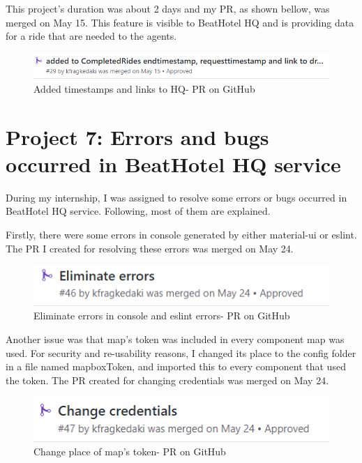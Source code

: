This project's duration was about 2 days and my PR, as shown bellow, was merged on May 15. This feature is visible to BeatHotel HQ and is providing data for a ride that are needed to the agents. \par

\begin{figure}[H]
	\begin{center}
		\includegraphics[scale=0.85]{images/my_projects/feature-add-timestamp-linkToHQ-PR.png}
	\end{center}
	\caption{Added timestamps and links to HQ- PR on GitHub}
\end{figure}


\section{Project 7: Errors and bugs occurred in BeatHotel HQ service}

During my internship, I was assigned to resolve some errors or bugs occurred in BeatHotel HQ service. Following, most of them are explained. \par

Firstly, there were some errors in console generated by either material-ui or eslint. The PR I created for resolving these errors was merged on May 24.

\begin{figure}[H]
	\begin{center}
		\includegraphics[scale=0.85]{images/my_projects/fix-eliminate-errors-PR.png}
	\end{center}
	\caption{Eliminate errors in console and eslint errors- PR on GitHub}
\end{figure}

Another issue was that map's token was included in every component map was used. For security and re-usability reasons, I changed its place to the config folder in a file named mapboxToken, and imported this to every component that used the token. The PR created for changing credentials was merged on May 24.

\begin{figure}[H]
	\begin{center}
		\includegraphics[scale=0.85]{images/my_projects/fix-change-credentials-PR.png}
	\end{center}
	\caption{Change place of map's token- PR on GitHub}
\end{figure}

